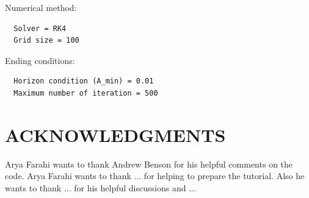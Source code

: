 \documentclass[12pt]{article}
\begin{document}
Numerical method:
\begin{verbatim}
  Solver = RK4
  Grid size = 100
\end{verbatim}

Ending conditions:
\begin{verbatim}
  Horizon condition (A_min) = 0.01
  Maximum number of iteration = 500
\end{verbatim}


\section*{ACKNOWLEDGMENTS}
 Arya Farahi wants to thank Andrew Benson for his helpful comments on the code. Arya Farahi wants to thank ... for helping to prepare the tutorial. Also he wants to thank ... for his helpful discussions and ...
 
\end{document}
